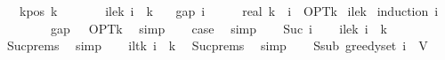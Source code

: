 \begin{isabellebody}
\ \ \ k{\isacharunderscore}{\kern0pt}pos{\isacharcolon}{\kern0pt}\ {\isachardoublequoteopen}k\ {\isachargreater}{\kern0pt}\ {}{\isachardoublequoteclose}\isanewline
\ \ \ \ \ i{\isacharunderscore}{\kern0pt}le{\isacharunderscore}{\kern0pt}k{\isacharcolon}{\kern0pt}\ {\isachardoublequoteopen}i\ {\isasymle}\ k{\isachardoublequoteclose}\isanewline
\ \ \ {\isachardoublequoteopen}gap\ i\ {\isasymle}\ {\isacharparenleft}{\kern0pt}{}\ {\isacharminus}{\kern0pt}\ {}\ {\isacharslash}{\kern0pt}\ real\ k{\isacharparenright}{\kern0pt}\ {\isacharcircum}{\kern0pt}\ i\ {\isacharasterisk}{\kern0pt}\ OPT{\isacharunderscore}{\kern0pt}k{\isachardoublequoteclose}\isanewline
%
\isadelimproof
%
\endisadelimproof
%
\isatagproof
{}\isamarkupfalse%
\ i{\isacharunderscore}{\kern0pt}le{\isacharunderscore}{\kern0pt}k\isanewline
{}\isamarkupfalse%
\ {\isacharparenleft}{\kern0pt}induction\ i{\isacharparenright}{\kern0pt}\isanewline
\ \ \isamarkupfalse%
\ {}\isanewline
\ \ \isamarkupfalse%
\ {\isachardoublequoteopen}gap\ {}\ {\isacharequal}{\kern0pt}\ OPT{\isacharunderscore}{\kern0pt}k{\isachardoublequoteclose}\ \isamarkupfalse%
\ simp\isanewline
\ \ \isamarkupfalse%
\ {\isacharquery}{\kern0pt}case\ \isamarkupfalse%
\ simp\isanewline
{}\isamarkupfalse%
\isanewline
\ \ \isamarkupfalse%
\ {\isacharparenleft}{\kern0pt}Suc\ i{\isacharparenright}{\kern0pt}\isanewline
\ \ \isamarkupfalse%
\ i{\isacharunderscore}{\kern0pt}le{\isacharunderscore}{\kern0pt}k{\isacharcolon}{\kern0pt}\ {\isachardoublequoteopen}i\ {\isasymle}\ k{\isachardoublequoteclose}\ \isamarkupfalse%
\ Suc{\isachardot}{\kern0pt}prems\ \isamarkupfalse%
\ simp\isanewline
\ \ \isamarkupfalse%
\ i{\isacharunderscore}{\kern0pt}lt{\isacharunderscore}{\kern0pt}k{\isacharcolon}{\kern0pt}\ {\isachardoublequoteopen}i\ {\isacharless}{\kern0pt}\ k{\isachardoublequoteclose}\ \isamarkupfalse%
\ Suc{\isachardot}{\kern0pt}prems\ \isamarkupfalse%
\ simp\isanewline
\isanewline
\ \ \isamarkupfalse%
\ S{\isacharunderscore}{\kern0pt}sub{\isacharcolon}{\kern0pt}\ {\isachardoublequoteopen}greedy{\isacharunderscore}{\kern0pt}set\ i\ {\isasymsubseteq}\ V{\isachardoublequoteclose}\isanewline
\ \ \ \ \isamarkupfalse%

\end{isabellebody}
